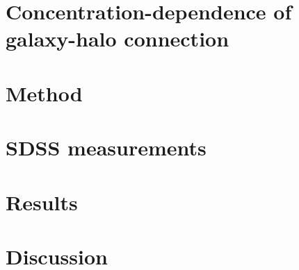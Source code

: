 \documentclass[12pt, preprint]{aastex}
\begin{document}
\section{Concentration-dependence of galaxy-halo connection}

\section{Method}

\section{SDSS measurements}

\section{Results}

\section{Discussion}


\begin{thebibliography}{70}


\end{thebibliography}
\end{document}
